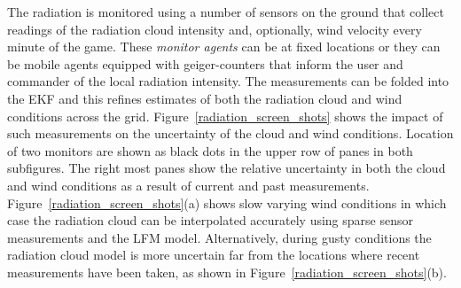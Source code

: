 The radiation is monitored using a number of sensors on the ground that collect readings of the radiation cloud intensity and, optionally, wind velocity every minute of the game. These {\it monitor agents} can be at fixed locations or they can be mobile agents equipped with geiger-counters that inform the user and commander of the local radiation intensity.  The measurements can be folded into the EKF and this refines estimates of both the radiation cloud and wind conditions across the grid.  Figure~\ref{radiation_screen_shots} shows the impact of such measurements on the uncertainty of the cloud and wind conditions.  Location of two monitors are shown as black dots in the upper row of panes in both subfigures.  The right most panes show the relative uncertainty in both the cloud and wind conditions as a result of current and past measurements.  Figure~\ref{radiation_screen_shots}(a) shows slow varying wind conditions in which case the radiation cloud can be interpolated accurately using sparse sensor measurements and the LFM model.  Alternatively, during gusty conditions the radiation cloud model is more uncertain far from the locations where recent measurements have been taken, as shown in Figure~\ref{radiation_screen_shots}(b).
